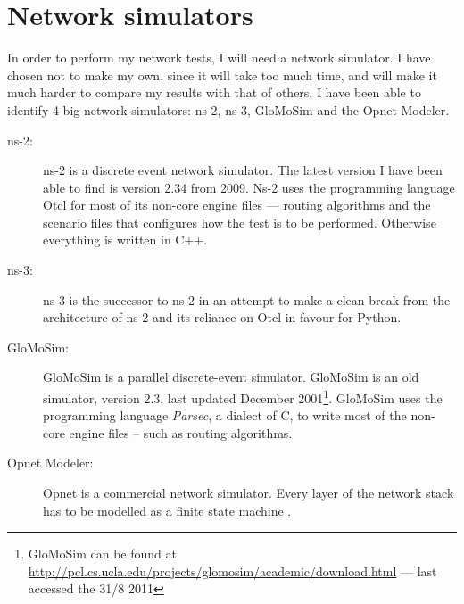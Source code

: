 \section{Network simulators}
\label{section:network_simulators}

In order to perform my network tests, I will need a network simulator. I have chosen not to make my own, since it will take too much time, and will make it much harder to compare my results with that of others. I have been able to identify 4 big network simulators: ns-2, ns-3, GloMoSim and the Opnet Modeler.

\begin{description}
\item[ns-2:] ns-2 is a discrete event network simulator. The latest version I have been able to find is version 2.34 from 2009. Ns-2 uses the programming language Otcl for most of its non-core engine files --- routing algorithms and the scenario files that configures how the test is to be performed. Otherwise everything is written in C++.
\item[ns-3:] ns-3 is the successor to ns-2 in an attempt to make a clean break from the architecture of ns-2 and its reliance on Otcl in favour for Python.
\item[GloMoSim:] GloMoSim is a parallel discrete-event simulator. GloMoSim is an old simulator, version 2.3, last updated December 2001\footnote{GloMoSim can be found at \url{http://pcl.cs.ucla.edu/projects/glomosim/academic/download.html} --- last accessed the 31/8 2011}. GloMoSim uses the programming language \emph{Parsec}, a dialect of C, to write most of the non-core engine files -- such as routing algorithms. 
\item[Opnet Modeler:] Opnet is a commercial network simulator. Every layer of the network stack has to be modelled as a finite state machine \cite{MANcom}. 
\end{description}

